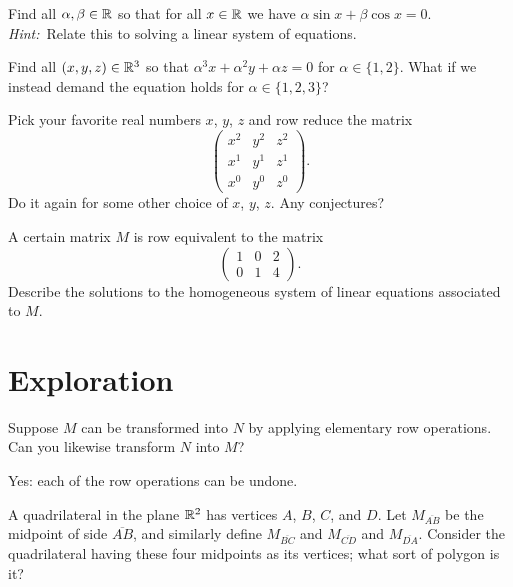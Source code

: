 \documentclass{homework}
\begin{document}
\begin{problem}\label{sin-cos-linear-system}Find all $\alpha, \beta \in \mathbb{R}$ so that for all $x \in \mathbb{R}$ we have $\alpha \sin x + \beta \cos x = 0$.  \textit{Hint:}~Relate this to solving a linear system of equations.
\end{problem}

\begin{problem}
  Find all $(x,y,z) \in \mathbb{R}^3$ so that $\alpha^3 x + \alpha^2 y + \alpha z = 0$ for $\alpha \in \{1,2\}$.  What if we instead demand the equation holds for $\alpha \in \{1,2,3\}$?
\end{problem}

\begin{problem}
  Pick your favorite real numbers $x$, $y$, $z$ and row reduce the matrix
  \[
    \begin{pmatrix}
      x^2 & y^2 & z^2 \\
      x^1 & y^1 & z^1 \\
      x^0 & y^0 & z^0            
    \end{pmatrix}.
  \]
  Do it again for some other choice of $x$, $y$, $z$.  Any conjectures?
\end{problem}

\begin{problem}
  A certain matrix $M$ is row equivalent to the matrix
  \[
    \begin{pmatrix}
      1 & 0 & 2 \\
      0 & 1 & 4
    \end{pmatrix}.
  \]
  Describe the solutions to the homogeneous system of linear equations
  associated to $M$.
\end{problem}

\section{Exploration}

\begin{problem}
  Suppose $M$ can be transformed into $N$ by applying elementary row
  operations.  Can you likewise transform $N$ into $M$?
\end{problem}

\begin{solution}
  Yes: each of the row operations can be undone.
\end{solution}

\begin{problem}\label{exploration:quadrilateral-midpoints}
  A quadrilateral in the plane $\mathbb{R}^2$ has vertices $A$, $B$, $C$, and
  $D$.  Let $M_{\overline{AB}}$ be the midpoint of side
  $\overline{AB}$, and similarly define $M_{\overline{BC}}$ and
  $M_{\overline{CD}}$ and $M_{\overline{DA}}$.  Consider the
  quadrilateral having these four midpoints as its vertices; what sort
  of polygon is it?
\end{problem}
\end{document}
